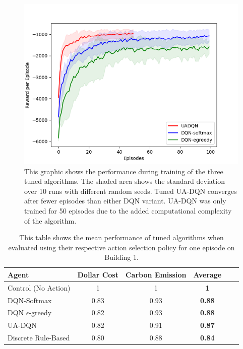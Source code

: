 \begin{figure}
  \centering
  \includegraphics[width=\figurewidth]{figures/tuning_validation.png}
  \caption{This graphic shows the performance during training of the three tuned algorithms. The shaded area shows the standard deviation over 10 runs with different random seeds. Tuned UA-DQN converges after fewer episodes than either DQN variant. UA-DQN was only trained for 50 episodes due to the added computational complexity of the algorithm.}
  \label{fig:tuning_validation}
\end{figure}

\begin{table}
  \centering
  \caption{This table shows the mean performance of tuned algorithms when evaluated using their respective action selection policy for one episode on Building 1.}
  \label{tab:tuned_results}
  \begin{tabular}{l|ccccc}
    Agent                 & Dollar Cost & Carbon Emission & Average \\ \hline
    Control (No Action)   & 1    & 1    & \textbf{1}    \\
    DQN-Softmax           & 0.83 & 0.93 & \textbf{0.88} \\
    DQN $\epsilon$-greedy & 0.82 & 0.93 & \textbf{0.88} \\
    UA-DQN                & 0.82 & 0.91 & \textbf{0.87} \\
    Discrete Rule-Based   & 0.80 & 0.88 & \textbf{0.84}
  \end{tabular}
\end{table}

